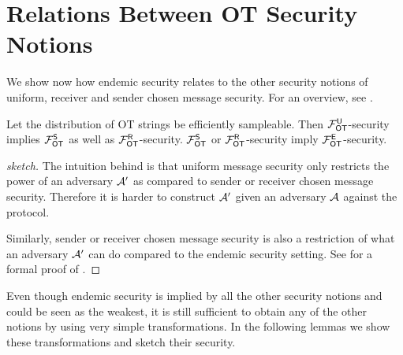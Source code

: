 \section{Relations Between OT Security Notions}\label{sec:relot}

We show now how endemic security relates to the other security notions of uniform, receiver and sender chosen message security. For an overview, see .
\begin{lemma}\label{lemma:is_a}
Let the distribution of OT strings be efficiently sampleable. 
Then $\mathcal{F}_{\mathsf{OT}}^\mathsf{U}$-security implies $\mathcal{F}_{\mathsf{OT}}^{\mathsf{S}}$ as well as $\mathcal{F}_{\mathsf{OT}}^\mathsf{R}$-security. $\mathcal{F}_{\mathsf{OT}}^{\mathsf{S}}$ or $\mathcal{F}_{\mathsf{OT}}^\mathsf{R}$-security imply $\mathcal{F}_{\mathsf{OT}}^\mathsf{E}$-security.
\end{lemma}

\iffullversion

\else
\begin{proof}[sketch]
	The intuition behind   is that uniform message security only restricts the power of an adversary $\mathcal{A}'$ as compared to sender or receiver chosen message security. Therefore it is harder to construct $\mathcal{A}'$ given an adversary $\mathcal{A}$ against the protocol.
	
	Similarly, sender or receiver chosen message security is also a restriction of what an adversary $\mathcal{A}'$ can do compared to the endemic security setting. 
	See   for a formal proof of .\pe
\end{proof}
\fi



Even though endemic security is implied by all the other security notions and could be seen as the weakest, it is still sufficient to obtain any of the other notions by using very simple transformations. In the following lemmas we show these transformations and sketch their security.   

